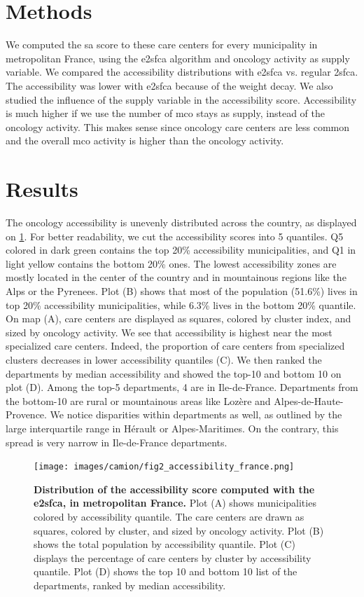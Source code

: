 \section{Methods}

We computed the \ac{sa} score to these care centers for every municipality in metropolitan France, using the \ac{e2sfca} algorithm and oncology activity as supply variable. We compared the accessibility distributions with \ac{e2sfca} vs. regular \ac{2sfca}. The accessibility was lower with \ac{e2sfca} because of the weight decay. We also studied the influence of the supply variable in the accessibility score. Accessibility is much higher if we use the number of \ac{mco} stays as supply, instead of the oncology activity. This makes sense since oncology care centers are less common and the overall \ac{mco} activity is higher than the oncology activity.

\section{Results}

The oncology accessibility is unevenly distributed across the country, as displayed on \cref{fig:accessibility-france}. For better readability, we cut the accessibility scores into 5 quantiles. Q5 colored in dark green contains the top 20\% accessibility municipalities, and Q1 in light yellow contains the bottom 20\% ones. The lowest accessibility zones are mostly located in the center of the country and in mountainous regions like the Alps or the Pyrenees. Plot (B) shows that most of the population (51.6\%) lives in top 20\% accessibility municipalities, while 6.3\% lives in the bottom 20\% quantile. On map (A), care centers are displayed as squares, colored by cluster index, and sized by oncology activity. We see that accessibility is highest near the most specialized care centers. Indeed, the proportion of care centers from specialized clusters decreases in lower accessibility quantiles (C). We then ranked the departments by median accessibility and showed the top-10 and bottom 10 on plot (D). Among the top-5 departments, 4 are in Ile-de-France. Departments from the bottom-10 are rural or mountainous areas like Lozère and Alpes-de-Haute-Provence.  We notice disparities within departments as well, as outlined by the large interquartile range in Hérault or Alpes-Maritimes. On the contrary, this spread is very narrow in Ile-de-France departments.

\begin{figure}[H]
    \texttt{[image: images/camion/fig2\_accessibility\_france.png]}
    \centering
    \caption{
        \textbf{Distribution of the accessibility score computed with the \ac{e2sfca}, in metropolitan France.} Plot (A) shows municipalities colored by accessibility quantile. The care centers are drawn as squares, colored by cluster, and sized by oncology activity. Plot (B) shows the total population by accessibility quantile. Plot (C) displays the percentage of care centers by cluster by accessibility quantile. Plot (D) shows the top 10 and bottom 10 list of the departments, ranked by median accessibility.
    }
    \label{fig:accessibility-france}
\end{figure}

